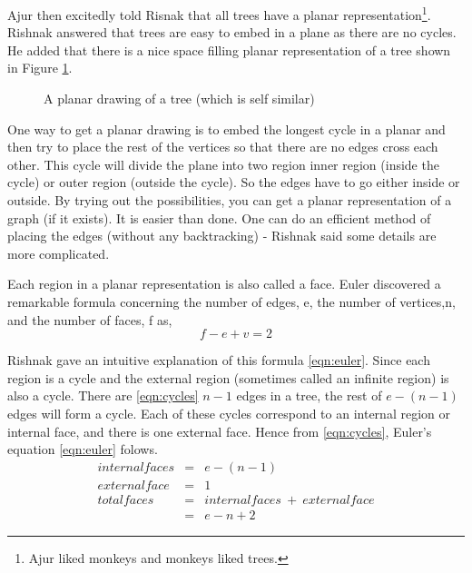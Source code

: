  Ajur then excitedly told Risnak that all trees have a planar representation\footnote{Ajur liked monkeys and monkeys liked trees.}. Rishnak answered that trees are easy to embed in a plane as there are
 no cycles. He added that there is a nice space filling planar representation of a tree shown in Figure \ref{9g7}.
\begin{figure}
\begin{center}    

  \caption{ A planar drawing of a tree (which is self similar)}\label{9g7}
  \end{center}
\end{figure}

One way to get a planar drawing is to embed the longest cycle in a planar and then try to place the rest of the vertices so that there are no edges cross each other. This cycle will divide the plane into two region inner region (inside the cycle) or outer region (outside the cycle). So the edges have to go either inside or outside. By trying out the possibilities, you can get a planar representation of a graph (if it exists). It is easier than done. One can do an efficient method of placing the edges (without any backtracking) - Rishnak said some details are more complicated. 

Each region in a planar representation is also called a face. Euler discovered a remarkable formula concerning the number of edges, e, the number of vertices,n, and the number of faces, f as,
\begin{equation}
\label{eqn:euler}
  f-e+v=2 
\end{equation}

 

Rishnak gave an intuitive explanation of this formula \ref{eqn:euler}. Since each region is a cycle and the external region (sometimes called an infinite region) is also a cycle. There are \ref{eqn:cycles} $n-1$ edges in a tree, the rest of $e-(n-1)$ edges will form a cycle. Each of these cycles correspond to an internal region or internal face, and there is one external face. Hence from \ref{eqn:cycles}, Euler's equation \ref{eqn:euler} folows.
\begin{eqnarray*}
    \label{eqn:cycles}
    internal faces&=&e-(n-1)\\
    external face&=&1\\
    total faces&=& internal faces~+~external face\\
    &=&e-n+2
\end{eqnarray*}

